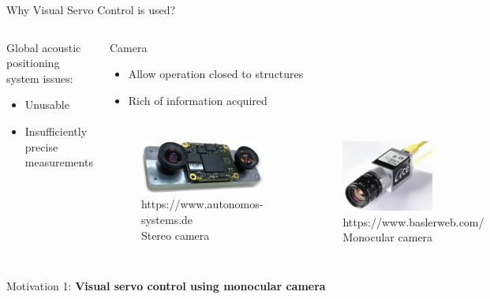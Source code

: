 \documentclass{beamer}
\begin{document}
\begin{frame}{Why Visual Servo Control is used?}

\begin{columns}[t]
	\begin{block}{{\footnotesize Global acoustic positioning system issues:}}		
		\begin{itemize}
			\item Unusable
			\item Insufficiently precise measurements
		\end{itemize}
	\end{block}
	\pause	
	\begin{block}{Camera}		
		\begin{itemize}
			\item Allow operation closed to structures
			\item Rich of information acquired
		\end{itemize}
		\vspace{-0.5cm}
		\begin{columns}
			\begin{figure}	
				\centering		
				\includegraphics[width = 43mm]{Images/stereo_camera.png}\\
				{\color{blue}\tiny  https://www.autonomos-systems.de} \\
				Stereo camera
			\end{figure}
			\begin{figure}				
				\includegraphics[width = 30mm]{Images/Monocular_camera.png}\\
				{\color{blue}\tiny https://www.baslerweb.com/} \\
				Monocular camera\\
			\end{figure}
			
		\end{columns}
	\end{block}	
	\end{columns}
	\pause
	\begin{exampleblock}{Motivation 1:}
		\centering
		{\color{red} \textbf{Visual servo control using monocular camera}}
	\end{exampleblock}
\end{frame}
\end{document}
